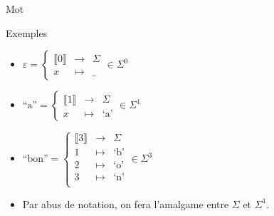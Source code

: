 \begin{frame}{Mot}
\begin{exampleblock}{Exemples}
    \begin{minipage}[t]{.5\textwidth}
      \begin{itemize}
      \item $\varepsilon = \left\{\begin{array}{ccc}
        \llbracket 0\rrbracket & \rightarrow & \Sigma\\
        x & \mapsto & \_
      \end{array}\right. \in \Sigma^0$
      \item $\text{``a''} = \left\{\begin{array}{ccc}
        \llbracket 1\rrbracket & \rightarrow & \Sigma\\
        x & \mapsto & \text{`a'}
      \end{array}\right. \in \Sigma^1$
      \end{itemize}
    \end{minipage}%
    \begin{minipage}[t]{.5\textwidth}
      \begin{itemize}
      \item $\text{``bon''} = \left\{\begin{array}{ccc}
        \llbracket 3\rrbracket& \rightarrow & \Sigma\\
        1 & \mapsto & \text{`b'}\\
        2 & \mapsto & \text{`o'}\\
        3 & \mapsto & \text{`n'}\\
      \end{array}\right. \in \Sigma^3$
      \end{itemize}
    \end{minipage}%
    \begin{itemize}
    \item Par abus de notation, on fera l'amalgame entre $\Sigma$ et $\Sigma^1$. 
    \end{itemize}
  \end{exampleblock}

\end{frame}

\endgroup
\endinput
